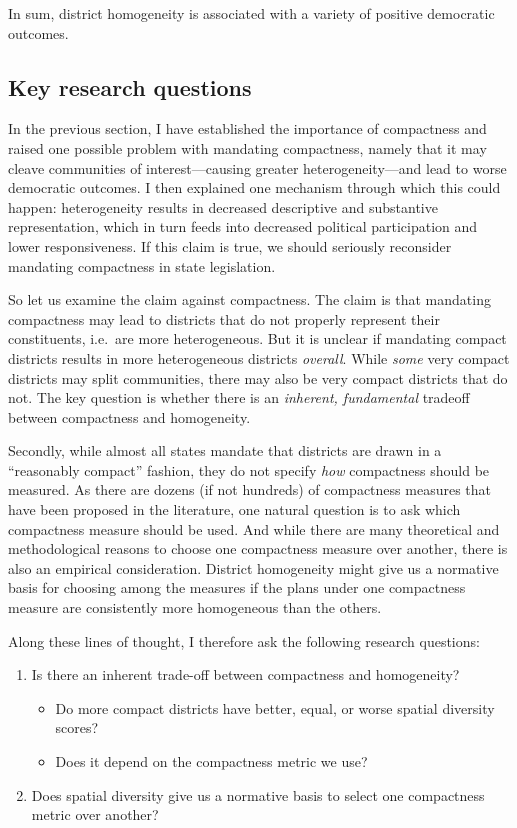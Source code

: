 \documentclass[]{article}
\providecommand{\tightlist}{%
  \setlength{\itemsep}{0pt}\setlength{\parskip}{0pt}}
\begin{document}
In sum, district homogeneity is associated with a variety of positive
democratic outcomes.

\hypertarget{key-research-questions}{%
\subsection{Key research questions}\label{key-research-questions}}

In the previous section, I have established the importance of
compactness and raised one possible problem with mandating compactness,
namely that it may cleave communities of interest---causing greater
heterogeneity---and lead to worse democratic outcomes. I then explained
one mechanism through which this could happen: heterogeneity results in
decreased descriptive and substantive representation, which in turn
feeds into decreased political participation and lower responsiveness.
If this claim is true, we should seriously reconsider mandating
compactness in state legislation.

So let us examine the claim against compactness. The claim is that
mandating compactness may lead to districts that do not properly
represent their constituents, i.e.~are more heterogeneous. But it is
unclear if mandating compact districts results in more heterogeneous
districts \emph{overall}. While \emph{some} very compact districts may
split communities, there may also be very compact districts that do not.
The key question is whether there is an \emph{inherent, fundamental}
tradeoff between compactness and homogeneity.

Secondly, while almost all states mandate that districts are drawn in a
``reasonably compact'' fashion, they do not specify \emph{how}
compactness should be measured. As there are dozens (if not hundreds) of
compactness measures that have been proposed in the literature, one
natural question is to ask which compactness measure should be used. And
while there are many theoretical and methodological reasons to choose
one compactness measure over another, there is also an empirical
consideration. District homogeneity might give us a normative basis for
choosing among the measures if the plans under one compactness measure
are consistently more homogeneous than the others.

Along these lines of thought, I therefore ask the following research
questions:

\begin{enumerate}
\def\labelenumi{\arabic{enumi}.}
\tightlist
\item
  Is there an inherent trade-off between compactness and homogeneity?

  \begin{itemize}
  \tightlist
  \item
    Do more compact districts have better, equal, or worse spatial
    diversity scores?
  \item
    Does it depend on the compactness metric we use?
  \end{itemize}
\item
  Does spatial diversity give us a normative basis to select one
  compactness metric over another?
\end{enumerate}
\end{document}
